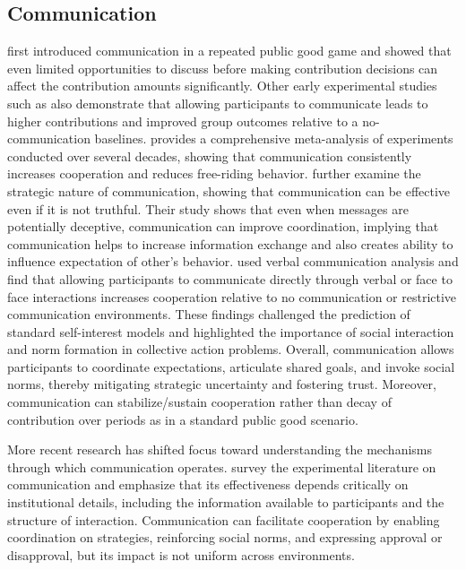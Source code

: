 \documentclass[12pt,letterpaper,english]{article}
\begin{document}
\subsection{Communication}

\cite{Isaac1988_Communication} first introduced communication in a repeated public good game and showed that even limited opportunities to discuss before making contribution decisions can affect the contribution amounts significantly. Other early experimental studies such as \cite{Dawes1977_Communication} also demonstrate that allowing participants to communicate leads to higher contributions and improved group outcomes relative to a no-communication baselines. \cite{Sally1995_Meta} provides a comprehensive meta-analysis of experiments conducted over several decades, showing that communication consistently increases cooperation and reduces free-riding behavior. \cite{wilson1997liar} further examine the strategic nature of communication, showing that communication can be effective even if it is not truthful. Their study shows that even when messages are potentially deceptive, communication can improve coordination, implying that communication helps to increase information exchange and also creates ability to influence expectation of other's behavior.
\cite{cason1999laboratory} used verbal communication analysis and find that allowing participants to communicate directly through verbal or face to face interactions increases cooperation relative to no communication or restrictive communication environments. These findings challenged the prediction of standard self-interest models and highlighted the importance of social interaction and norm formation in collective action problems. Overall, communication allows participants to coordinate expectations, articulate shared goals, and invoke social norms, thereby mitigating strategic uncertainty and fostering trust. Moreover, communication can stabilize/sustain cooperation rather than decay of contribution over periods as in a standard public good scenario.

More recent research has shifted focus toward understanding the mechanisms through which communication operates. \cite{Brandts2019_Communication} survey the experimental literature on communication and emphasize that its effectiveness depends critically on institutional details, including the information available to participants and the structure of interaction. Communication can facilitate cooperation by enabling coordination on strategies, reinforcing social norms, and expressing approval or disapproval, but its impact is not uniform across environments.
\end{document}
